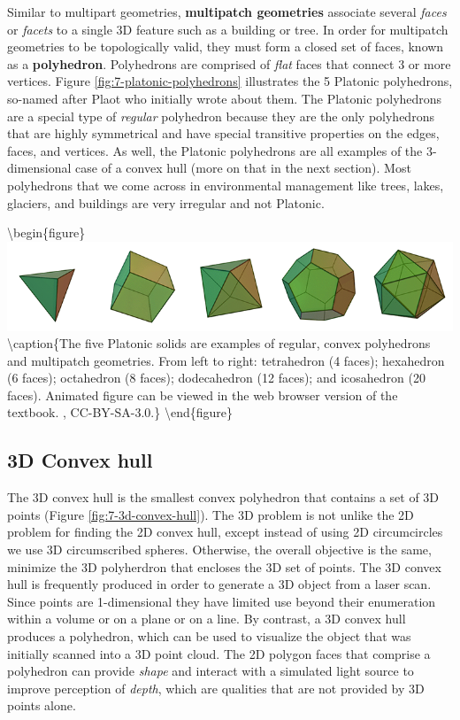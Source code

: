 \documentclass[
]{book}
\begin{document}
Similar to multipart geometries, \textbf{multipatch geometries} associate several \emph{faces} or \emph{facets} to a single 3D feature such as a building or tree. In order for multipatch geometries to be topologically valid, they must form a closed set of faces, known as a \textbf{polyhedron}. Polyhedrons are comprised of \emph{flat} faces that connect 3 or more vertices. Figure \ref{fig:7-platonic-polyhedrons} illustrates the 5 Platonic polyhedrons, so-named after Plaot who initially wrote about them. The Platonic polyhedrons are a special type of \emph{regular} polyhedron because they are the only polyhedrons that are highly symmetrical and have special transitive properties on the edges, faces, and vertices. As well, the Platonic polyhedrons are all examples of the 3-dimensional case of a convex hull (more on that in the next section). Most polyhedrons that we come across in environmental management like trees, lakes, glaciers, and buildings are very irregular and not Platonic.

\textbackslash begin\{figure\}
\includegraphics[width=0.75\linewidth]{images/07-platonic-polyhedrons} \textbackslash caption\{The five Platonic solids are examples of regular, convex polyhedrons and multipatch geometries. From left to right: tetrahedron (4 faces); hexahedron (6 faces); octahedron (8 faces); dodecahedron (12 faces); and icosahedron (20 faces). Animated figure can be viewed in the web browser version of the textbook. \citet{cyp_polyhedra_2005}, CC-BY-SA-3.0.\}\label{fig:7-platonic-polyhedrons}
\textbackslash end\{figure\}

\hypertarget{d-convex-hull}{%
\subsection{3D Convex hull}\label{d-convex-hull}}

The 3D convex hull is the smallest convex polyhedron that contains a set of 3D points (Figure \ref{fig:7-3d-convex-hull}). The 3D problem is not unlike the 2D problem for finding the 2D convex hull, except instead of using 2D circumcircles we use 3D circumscribed spheres. Otherwise, the overall objective is the same, minimize the 3D polyherdron that encloses the 3D set of points. The 3D convex hull is frequently produced in order to generate a 3D object from a laser scan. Since points are 1-dimensional they have limited use beyond their enumeration within a volume or on a plane or on a line. By contrast, a 3D convex hull produces a polyhedron, which can be used to visualize the object that was initially scanned into a 3D point cloud. The 2D polygon faces that comprise a polyhedron can provide \emph{shape} and interact with a simulated light source to improve perception of \emph{depth}, which are qualities that are not provided by 3D points alone.
\end{document}
